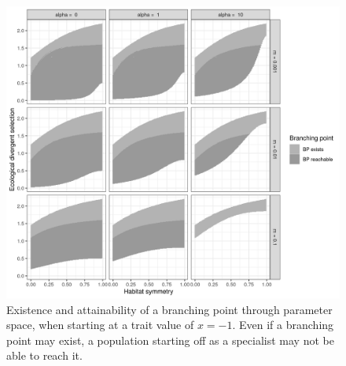 \begin{figure}
    \centering
    \includegraphics[width=\textwidth]{figures/branching_points_combined.png}
    \caption{Existence and attainability of a branching point through parameter space, when starting at a trait value of $x = -1$. Even if a branching point may exist, a population starting off as a specialist may not be able to reach it.}
    \label{fig:adaptive_dynamics2}
\end{figure}

